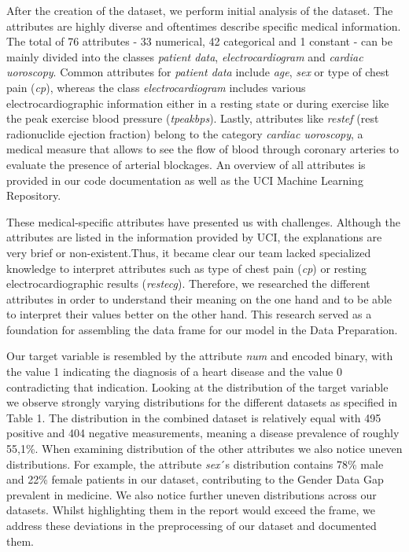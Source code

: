 \documentclass[11pt,titlepage,oneside,openany]{article}
\begin{document}
After the creation of the dataset, we perform initial analysis of the dataset. The attributes are highly diverse and oftentimes describe specific medical information. The total of 76 attributes - 33 numerical, 42 categorical and 1 constant - can be mainly divided into the classes \textit{patient data}, \textit{electrocardiogram} and \textit{cardiac uoroscopy}. Common attributes for \textit{patient data} include \textit{age}, \textit{sex} or type of chest pain (\textit{cp}), whereas the class \textit{electrocardiogram} includes various electrocardiographic information either in a resting state or during exercise like the peak exercise blood pressure (\textit{tpeakbps}). Lastly, attributes like \textit{restef} (rest radionuclide ejection fraction) belong to the category \textit{cardiac uoroscopy}, a medical measure that allows to see the flow of blood through coronary arteries to evaluate the presence of arterial blockages. An overview of all attributes is provided in our code documentation as well as the UCI Machine Learning Repository. 



These medical-specific attributes have presented us with challenges. Although the attributes are listed in the information provided by UCI, the explanations are very brief or non-existent.Thus, it became clear our team lacked specialized knowledge to interpret attributes such as type of chest pain (\textit{cp}) or resting electrocardiographic results (\textit{restecg}). Therefore, we researched the different attributes in order to understand their meaning on the one hand and to be able to interpret their values better on the other hand. This research served as a foundation for assembling the data frame for our model in the Data Preparation. 

Our target variable is resembled by the attribute \textit{num} and encoded binary, with the value 1 indicating the diagnosis of a heart disease and the value 0 contradicting that indication. Looking at the distribution of the target variable we observe strongly varying distributions for the different datasets as specified in Table 1. The distribution in the combined dataset is relatively equal with 495 positive and 404 negative measurements, meaning a disease prevalence of roughly 55,1\%. When examining distribution of the other attributes we also notice uneven distributions. For example, the attribute \textit{sex}´s distribution contains 78\% male and 22\% female patients in our dataset, contributing to the Gender Data Gap prevalent in medicine. We also notice further uneven distributions across our datasets. Whilst highlighting them in the report would exceed the frame, we address these deviations in the preprocessing of our dataset and documented them.  
\end{document}
